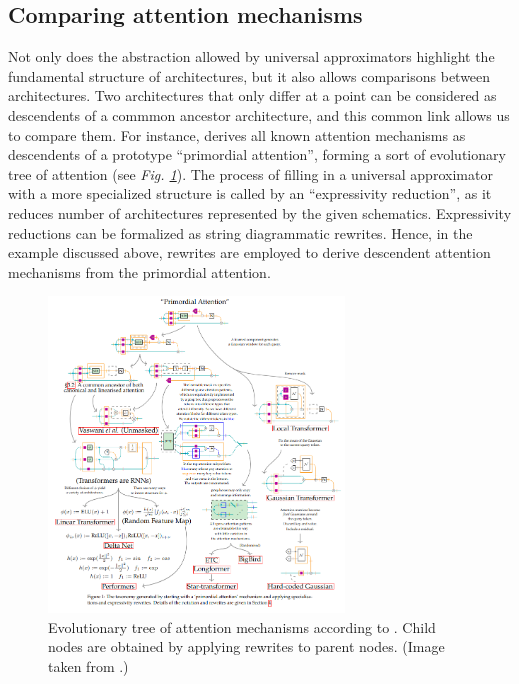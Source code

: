 \documentclass[11pt,a4paper,openright,twoside]{report}
\theoremstyle{plain}
\theoremstyle{definition}
\newcommand\dblquote[1]{\textquotedblleft #1\textquotedblright}
\begin{document}
\subsection{Comparing attention mechanisms}

Not only does the abstraction allowed by universal approximators highlight the fundamental structure of architectures, but it also allows comparisons between architectures. Two architectures that only differ at a point can be considered as descendents of a commmon ancestor architecture, and this common link allows us to compare them. For instance, \cite{khatri2024anatomy} derives all known attention mechanisms as descendents of a prototype \dblquote{primordial attention}, forming a sort of evolutionary tree of attention (see \textit{Fig. \ref{fig: attentiontree}}). The process of filling in a universal approximator with a more specialized structure is called by \cite{khatri2024anatomy} an \dblquote{expressivity reduction}, as it reduces number of architectures represented by the given schematics. Expressivity reductions can be formalized as string diagrammatic rewrites. Hence, in the example discussed above, rewrites are employed to derive descendent attention mechanisms from the primordial attention. 

\begin{figure}[h]
  \begin{center}
    \includegraphics[width=0.7\textwidth]{figures/attention_tree.png}
    \caption[Evolutionary tree of attention]{Evolutionary tree of attention mechanisms according to \cite{khatri2024anatomy}. Child nodes are obtained by applying rewrites to parent nodes. (Image taken from \cite{khatri2024anatomy}.)}
    \label{fig: attentiontree}
  \end{center}
\end{figure}
\end{document}
